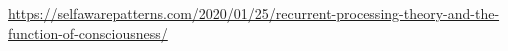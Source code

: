 \documentclass[a4paper]{article}
\title{}
\date{}
\begin{document}
\maketitle
    \url{https://selfawarepatterns.com/2020/01/25/recurrent-processing-theory-and-the-function-of-consciousness/}
\end{document}

